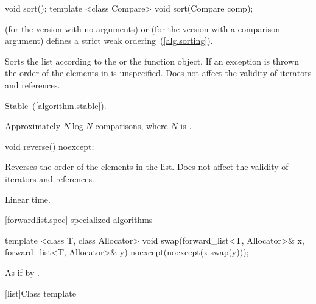 %
%
\begin{itemdecl}
void sort();
template <class Compare> void sort(Compare comp);
\end{itemdecl}

\begin{itemdescr}
\pnum
\requires {} (for the version with no arguments) or  (for the
version with a comparison argument) defines a strict weak ordering~(\ref{alg.sorting}).

\pnum
\effects Sorts the list according to the  or the  function object.
If an exception is thrown the order of the elements in  is unspecified.
Does not affect the validity of iterators and references.

\pnum
\remarks Stable~(\ref{algorithm.stable}).

\pnum
\complexity Approximately $N \log N$ comparisons, where $N$ is .
\end{itemdescr}

%
%
\begin{itemdecl}
void reverse() noexcept;
\end{itemdecl}

\begin{itemdescr}
\pnum
\effects Reverses the order of the elements in the list.
Does not affect the validity of iterators and references.

\pnum
\complexity Linear time.
\end{itemdescr}

[forwardlist.spec]{ specialized algorithms}

%
%
\begin{itemdecl}
template <class T, class Allocator>
  void swap(forward_list<T, Allocator>& x, forward_list<T, Allocator>& y)
    noexcept(noexcept(x.swap(y)));
\end{itemdecl}

\begin{itemdescr}
\pnum
\effects As if by .
\end{itemdescr}

[list]{Class template }


